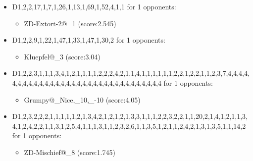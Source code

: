 \begin{appendices}
\begin{itemize}
        \item D1,2,2,17,1,7,1,26,1,13,1,69,1,52,4,1,1 for 1 opponents:
        \begin{multicols}{3}
            \begin{itemize}
                \item ZD-Extort-2@\_1 (score:2.545)
            \end{itemize}
        \end{multicols}

        \item D1,2,2,9,1,22,1,47,1,33,1,47,1,30,2 for 1 opponents:
        \begin{multicols}{3}
            \begin{itemize}
                \item Kluepfel@\_3 (score:3.04)
            \end{itemize}
        \end{multicols}

        \item D1,2,2,3,1,1,1,3,4,1,2,1,1,1,1,2,2,2,4,2,1,1,4,1,1,1,1,1,1,2,2,1,2,2,1,1,2,3,7,4,4,4,4,4,4,4,4,4,4,4,4,4,4,4,4,4,4,4,4,4,4,4,4,4,4,4,4,4,4,4,4 for 1 opponents:
        \begin{multicols}{3}
            \begin{itemize}
                \item Grumpy@\_Nice,\_10,\_-10 (score:4.05)
            \end{itemize}
        \end{multicols}

        \item D1,2,3,2,2,2,1,1,1,1,1,2,1,3,4,2,1,2,1,2,1,3,3,1,1,1,2,2,3,2,2,1,1,20,2,1,4,1,2,1,1,3,4,1,2,4,2,2,1,1,3,1,2,5,4,1,1,1,3,1,1,2,3,2,6,1,1,3,5,1,2,1,1,2,4,2,1,3,1,3,5,1,1,14,2 for 1 opponents:
        \begin{multicols}{3}
            \begin{itemize}
                \item ZD-Mischief@\_8 (score:1.745)
            \end{itemize}
        \end{multicols}


\end{itemize}
\end{appendices}
